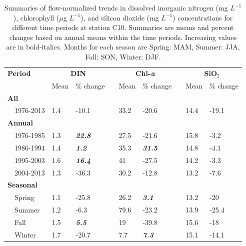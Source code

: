 \documentclass[letterpaper,12pt,oneside]{article}\usepackage[]{graphicx}\usepackage[]{color}
\begin{document}
\begin{table}[!tbp]
\caption{Summaries of flow-normalized trends in dissolved inorganic nitrogen (mg $L^{-1}$), chlorophyll ($\mu$g $L^{-1}$), and silicon dioxide (mg $L^{-1}$) concentrations for different time periods at station C10. Summaries are means and percent changes based on annual means within the time periods.  Increasing values are in bold-italics. Months for each season are Spring: MAM, Summer: JJA, Fall: SON, Winter: DJF.\label{tab:c10chg}} 
\begin{center}
\begin{tabular}{lllcllcll}
\hline\hline
\multicolumn{1}{l}{\bfseries Period}&\multicolumn{2}{c}{\bfseries DIN}&\multicolumn{1}{c}{\bfseries }&\multicolumn{2}{c}{\bfseries Chl-\textit{a}}&\multicolumn{1}{c}{\bfseries }&\multicolumn{2}{c}{\bfseries SiO$_2$}\tabularnewline
\cline{2-3} \cline{5-6} \cline{8-9}
\multicolumn{1}{l}{}&\multicolumn{1}{c}{Mean}&\multicolumn{1}{c}{\% change}&\multicolumn{1}{c}{}&\multicolumn{1}{c}{Mean}&\multicolumn{1}{c}{\% change}&\multicolumn{1}{c}{}&\multicolumn{1}{c}{Mean}&\multicolumn{1}{c}{\% change}\tabularnewline
\hline
{\bfseries All}&&&&&&&&\tabularnewline
~~1976-2013&1.4&-10.1&&33.2&-20.6&&14.4&-19.1\tabularnewline
\hline
{\bfseries Annual}&&&&&&&&\tabularnewline
~~1976-1985&1.3&\textit{\textbf{22.8}}&&27.5&-21.6&&15.8&-3.2\tabularnewline
~~1986-1994&1.4&\textit{\textbf{1.2}}&&35.3&\textit{\textbf{31.5}}&&14.8&-4.1\tabularnewline
~~1995-2003&1.6&\textit{\textbf{16.4}}&&41&-27.5&&14.2&-3.3\tabularnewline
~~2004-2013&1.3&-36.3&&30.2&-12.8&&13.2&-7.6\tabularnewline
\hline
{\bfseries Seasonal}&&&&&&&&\tabularnewline
~~Spring&1.1&-25.8&&26.2&\textit{\textbf{3.1}}&&13.2&-20\tabularnewline
~~Summer&1.2&-6.3&&79.6&-23.2&&13.9&-25.4\tabularnewline
~~Fall&1.5&\textit{\textbf{5.5}}&&19&-39.8&&15.6&-18\tabularnewline
~~Winter&1.7&-20.7&&7.7&\textit{\textbf{7.3}}&&15.1&-14.1\tabularnewline
\hline
\end{tabular}\end{center}

\end{table}
\end{document}
